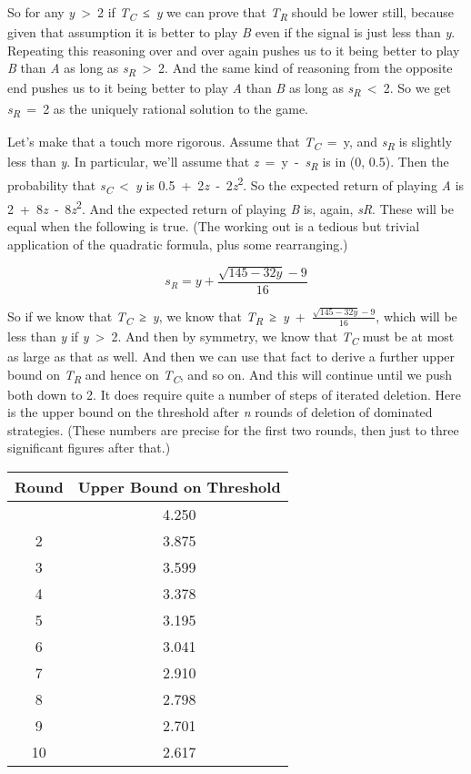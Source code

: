 \documentclass[
  11pt,
]{book}
\begin{document}
So for any \emph{y}~\textgreater~2 if \emph{T\textsubscript{C}}~≤~\emph{y} we can prove that \emph{T\textsubscript{R}} should be lower still, because given that assumption it is better to play \emph{B} even if the signal is just less than \emph{y}. Repeating this reasoning over and over again pushes us to it being better to play \emph{B} than \emph{A} as long as \emph{s\textsubscript{R}}~\textgreater~2. And the same kind of reasoning from the opposite end pushes us to it being better to play \emph{A} than \emph{B} as long as \emph{s\textsubscript{R}}~\textless~2. So we get \emph{s\textsubscript{R}}~=~2 as the uniquely rational solution to the game.

Let's make that a touch more rigorous. Assume that \emph{T\textsubscript{C}}~=~y, and \emph{s\textsubscript{R}} is slightly less than \emph{y}. In particular, we'll assume that \emph{z}~=~y~-~\emph{s\textsubscript{R}} is in (0, 0.5). Then the probability that \emph{s\textsubscript{C}}~\textless~\emph{y} is 0.5~+~2\emph{z}~‑~2\emph{z}\textsuperscript{2}. So the expected return of playing \emph{A} is 2~+~8\emph{z}~‑~8\emph{z}\textsuperscript{2}. And the expected return of playing \emph{B} is, again, \emph{sR}. These will be equal when the following is true. (The working out is a tedious but trivial application of the quadratic formula, plus some rearranging.)

\[
s_R = y + \frac{\sqrt{145-32y}-9}{16}
\]

So if we know that \emph{T\textsubscript{C}}~≥~\emph{y}, we know that \emph{T\textsubscript{R}}~≥~\emph{y}~+~\(\frac{\sqrt{145-32y}-9}{16}\), which will be less than \emph{y} if \emph{y}~\textgreater~2. And then by symmetry, we know that \emph{T\textsubscript{C}} must be at most as large as that as well. And then we can use that fact to derive a further upper bound on \emph{T\textsubscript{R}} and hence on \emph{T\textsubscript{C}}, and so on. And this will continue until we push both down to 2. It does require quite a number of steps of iterated deletion. Here is the upper bound on the threshold after \emph{n} rounds of deletion of dominated strategies. (These numbers are precise for the first two rounds, then just to three significant figures after that.)

\begin{longtable}[]{@{}cc@{}}
\toprule\noalign{}
Round & Upper Bound on Threshold \\
\midrule\noalign{}
\endhead
\bottomrule\noalign{}
\endlastfoot
1 & 4.250 \\
2 & 3.875 \\
3 & 3.599 \\
4 & 3.378 \\
5 & 3.195 \\
6 & 3.041 \\
7 & 2.910 \\
8 & 2.798 \\
9 & 2.701 \\
10 & 2.617 \\
\end{longtable}
\end{document}

